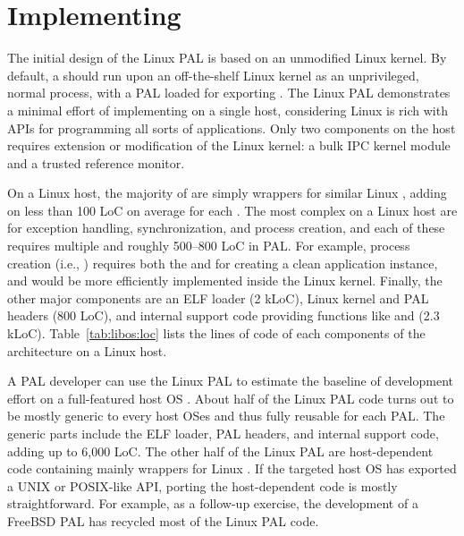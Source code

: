 \section{Implementing \thehostabi{}}
\label{sec:linux:impl}

The initial design of the Linux PAL is based on an unmodified Linux kernel.
By default, a \graphene{} \picoproc{} should run upon
an off-the-shelf Linux kernel as an unprivileged, normal process, with a PAL loaded for exporting \thehostabi{}.
The Linux PAL demonstrates a minimal effort of implementing \thehostabi{}
on a single host, considering Linux is rich with APIs for programming all sorts of applications.
Only two \graphene{} components on the host requires extension or modification of the Linux kernel: a bulk IPC kernel module and a trusted reference monitor.



On a Linux host,
the majority of \hostapis{} are simply wrappers
for similar Linux \linuxapis{},
adding on less than 100 LoC on average for each \hostapi{}.
The most complex \hostapis{} on a Linux host are for exception handling, synchronization, and process creation, and each of these \hostapis{} requires multiple \linuxapis{} and roughly 500--800 LoC in PAL.
For example, process creation (i.e., ) requires 
both the  and  \linuxapis{}
for creating a clean
application instance, and would be more efficiently
implemented inside the Linux kernel.
Finally, the other major \pal{} components are an ELF loader (2 kLoC),
Linux kernel and PAL headers (800 LoC),
and internal support code providing functions like  and  (2.3 kLoC).
Table~\ref{tab:libos:loc} lists the lines of code of each components of the \graphene{} architecture on a Linux host.


A PAL developer can use the Linux PAL to estimate the baseline of \thehostabi{} development effort on a full-featured host OS .
About half of the Linux PAL code turns out to be
mostly generic to every host OSes
and thus fully reusable for each PAL.
The generic parts include
the ELF loader, PAL headers, and internal support code, adding up to \roughly{}6,000 LoC.
The other half of the Linux PAL are host-dependent code containing mainly wrappers for Linux \linuxapis{}.
If the targeted host OS has exported a UNIX or POSIX-like API,
porting the host-dependent code is mostly straightforward.
For example, as a follow-up exercise, the development of a FreeBSD PAL has recycled most of the Linux PAL code.





